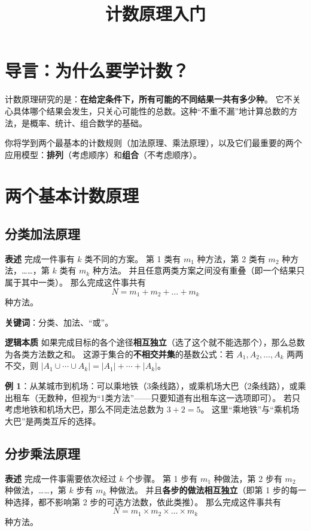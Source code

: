 \documentclass[10pt]{article}
\title{计数原理入门}
\author{}
\date{}
\begin{document}
\maketitle

\section{导言：为什么要学计数？}

计数原理研究的是：\textbf{在给定条件下，所有可能的不同结果一共有多少种}。
它不关心具体哪个结果会发生，只关心可能性的总数。这种“不重不漏”地计算总数的方法，是概率、统计、组合数学的基础。

你将学到两个最基本的计数规则（加法原理、乘法原理），以及它们最重要的两个应用模型：\textbf{排列}（考虑顺序）和\textbf{组合}（不考虑顺序）。

\section{两个基本计数原理}

\subsection{分类加法原理}

\textbf{表述}
完成一件事有 \(k\) 类不同的方案。
第 1 类有 \(m_1\) 种方法，第 2 类有 \(m_2\) 种方法，……，第 \(k\) 类有 \(m_k\) 种方法。
并且任意两类方案之间没有重叠（即一个结果只属于其中一类）。
那么完成这件事共有
\[
N = m_1 + m_2 + \dots + m_k
\]
种方法。

\textbf{关键词}：分类、加法、“或”。

\textbf{逻辑本质}
如果完成目标的各个途径\textbf{相互独立}（选了这个就不能选那个），那么总数为各类方法数之和。
这源于集合的\textbf{不相交并集}的基数公式：若 \(A_1, A_2, \dots, A_k\) 两两不交，则 \(|A_1 \cup \cdots \cup A_k| = |A_1| + \cdots + |A_k|\)。

\textbf{例 1}：从某城市到机场：可以乘地铁（3条线路），或乘机场大巴（2条线路），或乘出租车（无数种，但视为“1类方法”——只要知道有出租车这一选项即可）。
若只考虑地铁和机场大巴，那么不同走法总数为 \(3 + 2 = 5\)。
这里“乘地铁”与“乘机场大巴”是两类互斥的选择。

\subsection{分步乘法原理}

\textbf{表述}
完成一件事需要依次经过 \(k\) 个步骤。
第 1 步有 \(m_1\) 种做法，第 2 步有 \(m_2\) 种做法，……，第 \(k\) 步有 \(m_k\) 种做法。
并且\textbf{各步的做法相互独立}（即第 1 步的每一种选择，都不影响第 2 步的可选方法数，依此类推）。
那么完成这件事共有
\[
N = m_1 \times m_2 \times \dots \times m_k
\]
种方法。
\end{document}
